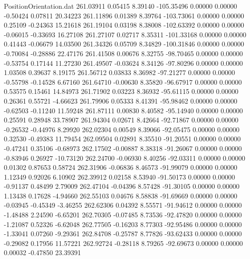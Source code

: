 \begin{filecontents}{PositionOrientation.dat}
 261.03911    0.05415    8.39140  -105.35496    0.00000    0.00000   -0.50424    0.07811   20.34223
 261.11896    0.01389    8.39764  -103.73061    0.00000    0.00000    0.25109   -0.24363   15.21618
 261.19104    0.03198    8.38008  -102.63392    0.00000    0.00000   -0.06015   -0.33693   16.27108
 261.27107    0.02717    8.35311  -101.33168    0.00000    0.00000    0.41443   -0.06679   14.03500
 261.34326    0.05709    8.34829  -100.31846    0.00000    0.00000   -0.70084   -0.28886   22.47176
 261.41508    0.00676    8.32755   -98.70465    0.00000    0.00000   -0.53754    0.17144   11.27230
 261.49507   -0.03624    8.34126   -97.80296    0.00000    0.00000    1.03508    0.39637    8.19175
 261.56712    0.03833    8.36982   -97.21277    0.00000    0.00000   -0.55798   -0.14528    6.67160
 261.64710   -0.00630    8.35820   -96.67917    0.00000    0.00000    0.53575    0.15461   14.84973
 261.71902    0.03223    8.36932   -95.61115    0.00000    0.00000    0.26361    0.55721   -4.66623
 261.79906    0.05333    8.41391   -95.98462    0.00000    0.00000   -0.62503   -0.11240   11.59248
 261.87111    0.00830    8.40582   -95.14940    0.00000    0.00000    0.25591    0.28948   33.78907
 261.94304    0.02671    8.42664   -92.71867    0.00000    0.00000   -0.26532   -0.44976    8.29920
 262.02304    0.00549    8.39066   -92.05475    0.00000    0.00000    0.32530   -0.49383   11.79454
 262.09504    0.02891    8.35510   -91.20551    0.00000    0.00000   -0.47241    0.35106   -0.68973
 262.17502   -0.00887    8.38318   -91.26067    0.00000    0.00000   -0.83946    0.26927  -10.73120
 262.24700   -0.06930    8.40256   -92.03311    0.00000    0.00000    0.01302    0.87653    0.58724
 262.31906   -0.06836    8.46573   -91.99079    0.00000    0.00000    1.12349    0.92026    6.10902
 262.39912    0.02158    8.53940   -91.50173    0.00000    0.00000   -0.91137    0.48499    2.79009
 262.47104   -0.04396    8.57428   -91.30105    0.00000    0.00000    1.13438    0.17628   -4.94660
 262.55103    0.04676    8.58838   -91.69669    0.00000    0.00000   -0.03945   -0.45349   -3.46255
 262.62306    0.04392    8.55571   -91.94612    0.00000    0.00000   -1.48488    2.24590   -6.65201
 262.70305   -0.07485    8.73536   -92.47820    0.00000    0.00000   -1.21087    0.52326   -6.62048
 262.77505   -0.16203    8.77303   -92.95486    0.00000    0.00000   -1.33041    0.07260   -9.29361
 262.84708   -0.25787    8.77826   -93.62433    0.00000    0.00000   -0.29082    0.17956   11.57221
 262.92724   -0.28118    8.79265   -92.69673    0.00000    0.00000    0.00032   -0.47850   23.39391

\end{filecontents}
